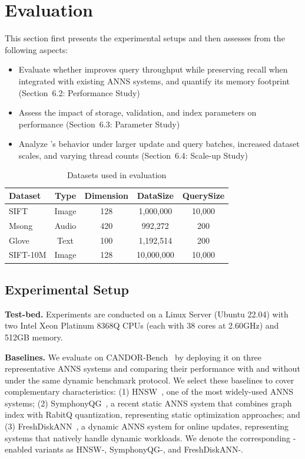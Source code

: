 \section{Evaluation}
This section first presents the experimental setups and then assesses \system from the following aspects:
\begin{itemize}
    \item Evaluate whether \system improves query throughput while preserving recall when integrated with existing ANNS systems, and quantify its memory footprint (Section~6.2: Performance Study)
    \item Assess the impact of storage, validation, and index parameters on performance (Section~6.3: Parameter Study)
    \item Analyze \system’s behavior under larger update and query batches, increased dataset scales, and varying thread counts (Section~6.4: Scale-up Study)
\end{itemize}

\begin{table}[t]
    \centering
    \caption{Datasets used in evaluation}
    \label{tab:eval-datasets}
    \begin{tabular}{lcccc}
        \toprule
        Dataset & Type & Dimension & DataSize & QuerySize \\
        \midrule
        SIFT & Image &128 & 1,000,000 & 10,000 \\
        Msong & Audio & 420 & 992,272 & 200 \\
        Glove & Text & 100 &  1,192,514 & 200 \\
        SIFT-10M & Image &128 & 10,000,000 & 10,000 \\
        \bottomrule
    \end{tabular}
\end{table}

\subsection{Experimental Setup}
\noindent \textbf{Test-bed.} Experiments are conducted on a Linux Server (Ubuntu 22.04) with two Intel Xeon Platinum 8368Q CPUs (each with 38 cores at 2.60GHz) and 512GB memory.

\noindent \textbf{Baselines.} We evaluate \system on CANDOR-Bench~\cite{Wang202627} by deploying it on three representative ANNS systems and comparing their performance with and without \system under the same dynamic benchmark protocol. We select these baselines to cover complementary characteristics: (1) HNSW~\cite{Malkov2020824}, one of the most widely-used ANNS systems;
(2) SymphonyQG~\cite{Gou2025}, a recent static ANNS system that combines graph index with RabitQ quantization, representing static optimization approaches; and 
(3) FreshDiskANN~\cite{Singh2021}, a dynamic ANNS system for online updates, representing systems that natively handle dynamic workloads.
We denote the corresponding \system-enabled variants as HNSW-\system, SymphonyQG-\system, and FreshDiskANN-\system.



